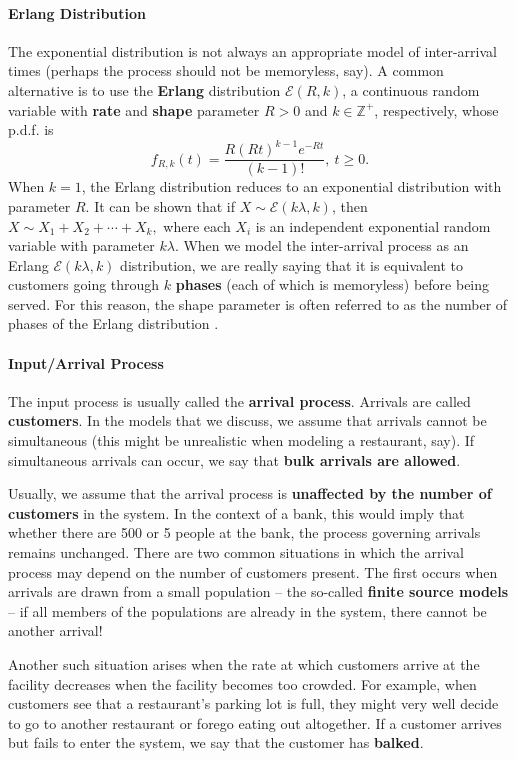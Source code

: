 \paragraph{Erlang Distribution}
The exponential distribution is not always an appropriate model of inter-arrival times (perhaps the process should not be memoryless, say). A common alternative is to use the \textbf{Erlang} distribution $\mathcal{E}(R,k)$, a continuous random variable with \textbf{rate} and \textbf{shape} parameter $R>0$ and $k\in \mathbb{Z}^+$, respectively, whose p.d.f. is  
$$ f_{R,k}(t) = \frac{R (Rt)^{k-1} e^{-Rt}}{(k-1)!},\ t\geq 0.$$
When $k=1$, the Erlang distribution reduces to an exponential distribution with parameter $R$. It can be shown that if $X\sim \mathcal{E}(k\lambda,k)$, then  $X\sim X_{1}+X_{2}+\cdots+X_{k},$ where each $X_{i}$ is an independent exponential random variable with parameter $k \lambda$. \newl When we model the inter-arrival process as an Erlang $\mathcal{E}(k\lambda,k)$ distribution, we are really saying that it is equivalent to customers going through $k$ \textbf{phases} (each of which is memoryless) before being served. For this reason, the shape parameter is often referred to as the number of phases of the Erlang distribution \cite{QS_N}.
\paragraph{Input/Arrival Process}
The input process is usually called the \textbf{arrival process}. Arrivals are called \textbf{customers}. In the models that we discuss, we assume that arrivals cannot be simultaneous (this might be unrealistic when modeling a restaurant, say). If simultaneous arrivals can occur, we say that \textbf{bulk arrivals are allowed}. 
\par Usually, we assume that the arrival process is \textbf{unaffected by the number of customers} in the system. In the context of a bank, this would imply that whether there are 500 or 5 people at the bank, the process governing arrivals remains unchanged.  
\newl There are two common situations in which the arrival process may depend on the number of customers present. The first occurs when arrivals are drawn from a small population -- the so-called \textbf{finite source models} -- if all members of the populations are already in the system, there cannot be another arrival!\par Another such situation arises when the rate at which customers arrive at the facility decreases when the facility becomes too crowded. For example, when customers see that a restaurant's parking lot is full, they might very well decide to go to another restaurant or forego eating out altogether. If a customer arrives but fails to enter the system, we say that the customer has \textbf{balked}.
